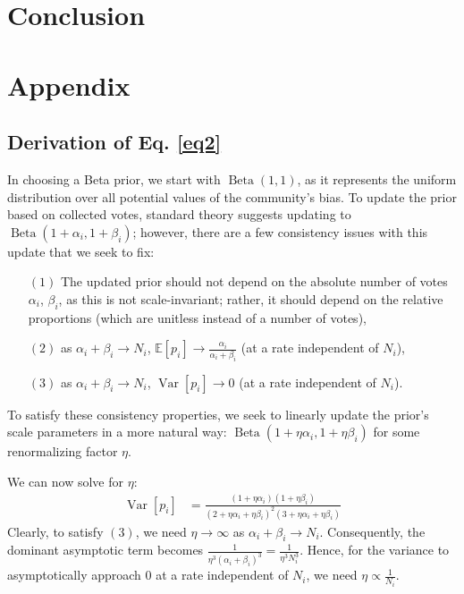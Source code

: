 \documentclass[format=acmsmall, review=true, screen=true, anonymous=true]{acmart}
\begin{document}
\section{Conclusion}
\label{sec:conclusion}

\appendix
\section*{Appendix}
\label{sec:derivation}


\subsection*{Derivation of Eq. \eqref{eq2}}
In choosing a Beta prior, we start with $\operatorname{Beta}(1,1)$, as it represents the uniform distribution over all potential values of the community's bias.  To update the prior based on collected votes, standard theory suggests updating to $\operatorname{Beta}(1+\alpha_i,1+\beta_i)$; however, there are a few consistency issues with this update that we seek to fix:
\begin{itemize}
\item[$(1)$] The updated prior should not depend on the absolute number of votes $\alpha_i$, $\beta_i$, as this is not scale-invariant; rather, it should depend on the relative proportions (which are unitless instead of a number of votes),
\item[$(2)$] as $\alpha_i + \beta_i \rightarrow N_i$, $\mathbb{E}[p_i] \rightarrow \frac{\alpha_i}{\alpha_i+\beta_i}$ (at a rate independent of $N_i$),
\item[$(3)$] as $\alpha_i + \beta_i \rightarrow N_i$, $\operatorname{Var}[p_i] \rightarrow 0$ (at a rate independent of $N_i$).
\end{itemize}
To satisfy these consistency properties, we seek to linearly update the prior's scale parameters in a more natural way: $\operatorname{Beta}(1+\eta\alpha_i,1+\eta\beta_i)$ for some renormalizing factor $\eta$.

We can now solve for $\eta$:
\begin{align*}
\operatorname{Var}[p_i] &= \frac{(1+\eta\alpha_i)(1+\eta\beta_i)}{(2+\eta\alpha_i+\eta\beta_i)^2(3+\eta\alpha_i+\eta\beta_i)}
\end{align*}
Clearly, to satisfy $(3)$, we need $\eta \rightarrow \infty$ as $\alpha_i + \beta_i \rightarrow N_i$.  Consequently, the dominant asymptotic term becomes $\frac{1}{\eta^3 (\alpha_i + \beta_i)^3} = \frac{1}{\eta^3 N_i^3}$.  Hence, for the variance to asymptotically approach $0$ at a rate independent of $N_i$, we need $\eta \propto \frac{1}{N_i}$.
\end{document}
